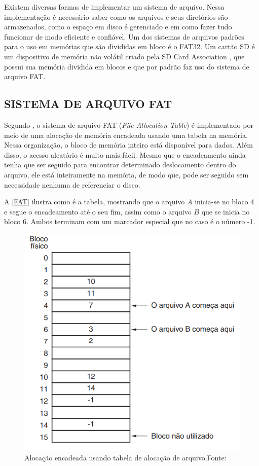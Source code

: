 Existem diversas formas de implementar um sistema de arquivo. Nessa implementação é necessário saber como os arquivos e seus diretórios são armazenados, como o espaço em disco é gerenciado e em como fazer tudo funcionar de modo eficiente e confiável. 
Um dos sistemas de arquivos padrões para o uso em memórias que são divididas em bloco é o FAT32. 
Um cartão SD é um dispositivo de memória não volátil criado pela SD Card Association \cite{SDCARD}, que possui sua memória dividida em blocos e que por padrão faz uso do sistema de arquivo FAT.




\subsection{SISTEMA DE ARQUIVO FAT}

Segundo , o sistema de arquivo FAT (\textit{File Allocation Table}) é implementado por meio de uma alocação de memória encadeada usando uma tabela na memória. Nessa organização, o bloco de memória inteiro está disponível para dados. Além disso, o acesso aleatório é muito mais fácil. Mesmo que o encadeamento ainda tenha que ser seguido para encontrar determinado deslocamento dentro do arquivo, ele está inteiramente na memória, de modo que, pode ser seguido sem necessidade nenhuma de referenciar o disco.

A \autoref{FAT} ilustra como é a tabela, mostrando que o arquivo $A$ inicia-se no bloco 4 e segue o encadeamento até o seu fim, assim como o arquivo $B$ que se inicia no bloco 6. Ambos terminam com um marcador especial que no caso é o número -1.

\begin{figure}[H]
    \scriptsize
     \centering
     \includegraphics[scale=0.7]{dados/figuras/FAT.png}
     \caption{Alocação encadeada usando tabela de alocação de arquivo.\newline  Fonte:\cite{tanenbaumSO}}
     \label{FAT}
\end{figure}

